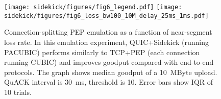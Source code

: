 \begin{figure}[t]
\centering
\texttt{[image: sidekick/figures/fig6\_legend.pdf]}
\texttt{[image: sidekick/figures/fig6\_loss\_bw100\_10M\_delay\_25ms\_1ms.pdf]}
\caption{Connection-splitting PEP emulation as a function of near-segment
	loss rate. In this emulation experiment, QUIC+Sidekick (running PACUBIC)
  performs similarly to TCP+PEP (each connection running CUBIC)
  and improves goodput compared with end-to-end protocols. The graph shows
  median goodput of a 10~MByte upload. QuACK interval is 30~ms, threshold
is 10. Error bars show IQR of 10 trials.
}
\label{fig:sidekick:fairness-line}
\end{figure}
